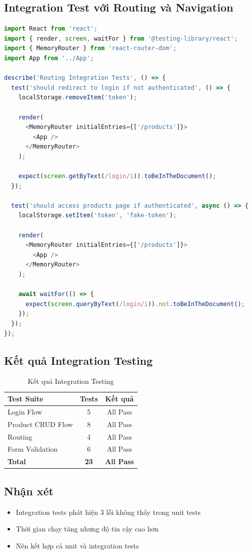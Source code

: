 \subsection{Integration Test với Routing và Navigation}
\begin{lstlisting}[language=JavaScript, caption=Routing Integration Test]
import React from 'react';
import { render, screen, waitFor } from '@testing-library/react';
import { MemoryRouter } from 'react-router-dom';
import App from '../App';

describe('Routing Integration Tests', () => {
  test('should redirect to login if not authenticated', () => {
    localStorage.removeItem('token');

    render(
      <MemoryRouter initialEntries={['/products']}>
        <App />
      </MemoryRouter>
    );

    expect(screen.getByText(/login/i)).toBeInTheDocument();
  });

  test('should access products page if authenticated', async () => {
    localStorage.setItem('token', 'fake-token');

    render(
      <MemoryRouter initialEntries={['/products']}>
        <App />
      </MemoryRouter>
    );

    await waitFor(() => {
      expect(screen.queryByText(/login/i)).not.toBeInTheDocument();
    });
  });
});
\end{lstlisting}

\subsection{Kết quả Integration Testing}
\begin{table}[H]
\centering
\begin{tabular}{|l|c|c|}
\hline
\textbf{Test Suite} & \textbf{Tests} & \textbf{Kết quả} \\
\hline
Login Flow & 5 & All Pass \\
\hline
Product CRUD Flow & 8 & All Pass \\
\hline
Routing & 4 & All Pass \\
\hline
Form Validation & 6 & All Pass \\
\hline
\textbf{Total} & \textbf{23} & \textbf{All Pass} \\
\hline
\end{tabular}
\caption{Kết quả Integration Testing}
\end{table}

\subsection{Nhận xét}
\begin{itemize}
    \item Integration tests phát hiện 3 lỗi không thấy trong unit tests
    \item Thời gian chạy tăng nhưng độ tin cậy cao hơn
    \item Nên kết hợp cả unit và integration tests
\end{itemize}
